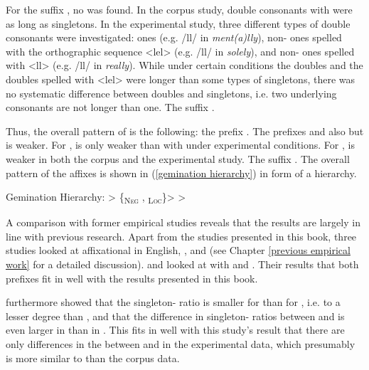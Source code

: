 For the suffix , no  was found. In the corpus study, double consonants with  were as long as singletons. In the experimental study, three different types of double consonants were investigated:  ones (e.g. /ll/ in  \textit{ment(a)lly}), non- ones spelled with the orthographic sequence <lel> (e.g. /ll/ in \textit{solely}), and non- ones spelled with <ll> (e.g. /ll/ in \textit{really}). While under certain conditions the  doubles and the doubles spelled with <lel> were longer than some types of singletons, there was no systematic difference between doubles and singletons, i.e. two underlying consonants are not longer than one. The suffix  .



Thus, the overall pattern of  is the following: the prefix  . The prefixes  and   also  but  is weaker. For ,  is only weaker than  with  under experimental conditions. For ,  is weaker in both the corpus and the experimental study. The suffix  . The overall  pattern of the affixes is shown in (\ref{gemination hierarchy}) in form of a hierarchy.


\begin{exe}
	
	\ex \label{gemination hierarchy} {Gemination Hierarchy}: \hspace*{0.5cm}	{ > \{\textsubscript{\textsc{Neg}} ,  \textsubscript{\textsc{Loc}}\}>  > }
	
\end{exe}


A comparison with former empirical studies reveals that the results are largely in line with previous research. 
Apart from the studies presented in this book, three studies looked at affixational  in English, \cite{Kaye.2005}, \cite{Oh.2012} and \cite{Kotzor.2016} (see Chapter \ref{previous empirical work} for a detailed discussion). 
\cite{Kaye.2005} and \cite{Oh.2012} looked at  with  and . Their results that both prefixes  fit in well with the results presented in this book.

\cite{Oh.2012} furthermore showed that the singleton- ratio is smaller for  than for , i.e.   to a lesser degree than , and that the difference in singleton- ratios between  and  is even larger in  than in . 
This fits in well with this study's result that there are only differences in the  between  and  in the experimental data, which presumably is more similar to  than the corpus data.

